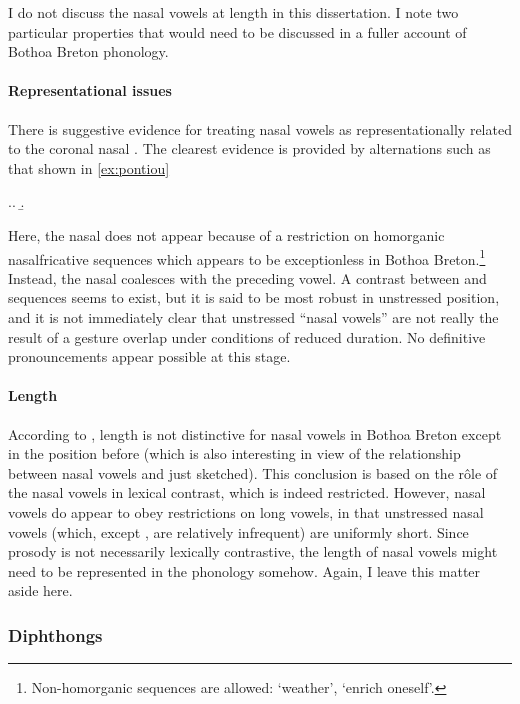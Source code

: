 I do not discuss the nasal vowels at length in this dissertation. I note two particular properties that would need to be discussed in a fuller account of Bothoa Breton phonology.

\paragraph{Representational issues}
\label{sec:repr-issu}

There is suggestive evidence for treating nasal vowels as representationally related to the coronal nasal \ipa{[n]}. The clearest evidence is provided by alternations such as that shown in \cref{ex:pontiou}

\ex.\label{ex:pontiou}\a.
\b.

Here, the nasal does not appear because of a restriction on homorganic nasal\endash fricative sequences which appears to be exceptionless in Bothoa Breton.\footnote{Non-homorganic sequences are allowed: \ipa{[ˈamzər]} `weather', \ipa{[ˈpinviʧad̥]} `enrich oneself'.} Instead, the nasal coalesces with the preceding vowel. A contrast between \ipa{[Ṽn]} and \ipa{[Vn]} sequences seems to exist, but it is said to be most robust in unstressed position, and it is not immediately clear that unstressed \enquote{nasal vowels} are not really the result of a gesture overlap under conditions of reduced duration. No definitive pronouncements appear possible at this stage.

\paragraph{Length}
\label{sec:length}

According to \citet{humphreys95:_phonol_bothoa_saint_nicol_pelem}, length is not distinctive for nasal vowels in Bothoa Breton except \ipa{[ã]} in the position before \ipa{[n]} (which is also interesting in view of the relationship between nasal vowels and \ipa{[n]} just sketched). This conclusion is based on the rôle of the nasal vowels in lexical contrast, which is indeed restricted. However, nasal vowels do appear to obey restrictions on long vowels, in that unstressed nasal vowels (which, except \ipa{[ã]}, are relatively infrequent) are uniformly short. Since prosody is not necessarily lexically contrastive, the length of nasal vowels might need to be represented in the phonology somehow. Again, I leave this matter aside here.

\subsubsection{Diphthongs}
\label{sec:diphthongs-bothoa}

